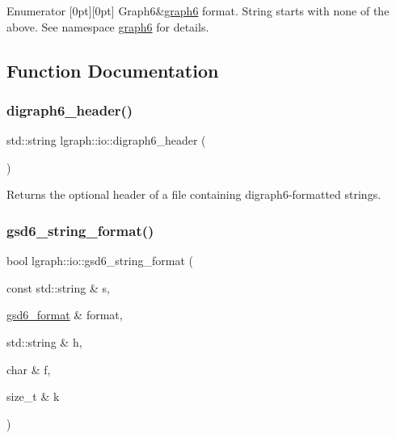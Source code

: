 \begin{DoxyEnumFields}{Enumerator}
[0pt][0pt]{}\mbox{\label{namespacelgraph_1_1io_ad0917668d35430ffe13d455d687be4ffa2e43b93fa3f1c33bc0ca7890f2e9bb73}} 
Graph6&\hyperlink{namespacelgraph_1_1io_1_1graph6}{graph6} format. String starts with none of the above. See namespace \hyperlink{namespacelgraph_1_1io_1_1graph6}{graph6} for details. \\
\hline

\end{DoxyEnumFields}


\subsection{Function Documentation}
\mbox{\label{namespacelgraph_1_1io_a045d4701d064cd1f3be3775c3edad35f}} 
\subsubsection{\texorpdfstring{digraph6\+\_\+header()}{digraph6\_header()}}
{\footnotesize\ttfamily std\+::string lgraph\+::io\+::digraph6\+\_\+header (\begin{DoxyParamCaption}{ }\end{DoxyParamCaption})\hspace{0.3cm}{\ttfamily [inline]}}

Returns the optional header of a file containing digraph6-\/formatted strings. \mbox{\label{namespacelgraph_1_1io_a555bafffaae99fce108ea5d4d58e365c}} 
\subsubsection{\texorpdfstring{gsd6\+\_\+string\+\_\+format()}{gsd6\_string\_format()}}
{\footnotesize\ttfamily bool lgraph\+::io\+::gsd6\+\_\+string\+\_\+format (\begin{DoxyParamCaption}\item[{const std\+::string \&}]{s,  }\item[{\hyperlink{namespacelgraph_1_1io_ad0917668d35430ffe13d455d687be4ff}{gsd6\+\_\+format} \&}]{format,  }\item[{std\+::string \&}]{h,  }\item[{char \&}]{f,  }\item[{size\+\_\+t \&}]{k }\end{DoxyParamCaption})}



